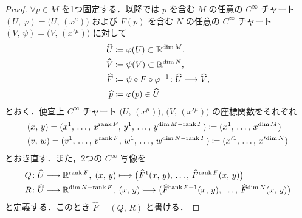 \documentclass[geometry_main]{subfiles}
\begin{document}
\begin{proof}
    $\forall p \in M$ を1つ固定する．以降では $p$ を含む $M$ の任意の $C^\infty$ チャート $(U,\, \varphi) = \bigl( U,\, (x^\mu) \bigr) $ および $F(p)$ を含む $N$ の任意の $C^\infty$ チャート $(V,\, \psi) = \bigl( V,\, (x'{}^\mu) \bigr) $ に対して
    \begin{align}
        \widehat{U} &\coloneqq \varphi(U) \subset \mathbb{R}^{\dim M}, \\
        \widehat{V} &\coloneqq \psi(V) \subset \mathbb{R}^{\dim N}, \\
        \widehat{F} &\coloneqq \psi \circ F \circ \varphi^{-1} \colon \widehat{U} \longrightarrow \widehat{V}, \\
        \widehat{p} &\coloneqq \varphi(p) \in \widehat{U}
    \end{align}
    とおく．便宜上 $C^\infty$ チャート $\bigl(U,\, (x^\mu)\bigr),\, \bigl(V,\, (x'{}^\mu)\bigr)$ の座標関数をそれぞれ
    \begin{align}
        &(x,\, y) = (x^1,\, \dots,\, x^{\rank F},\, y^1,\, \dots,\, y^{\dim M - \rank F})
        \coloneqq (x^1,\, \dots,\, x^{\dim M})  \\
        &(v,\, w) = (v^1,\, \dots,\, v^{\rank F},\, w^1,\, \dots,\, w^{\dim N - \rank F})
        \coloneqq (x'{}^1,\, \dots,\, x'{}^{\dim N}) 
    \end{align}
    とおき直す．また，2つの $C^\infty$ 写像を
    \begin{align}
        Q \colon \widehat{U} &\longrightarrow \mathbb{R}^{\rank F},\; (x,\, y) \longmapsto \bigl( \widehat{F}^1(x,\, y),\, \dots,\, \widehat{F}^{\rank F} (x,\, y) \bigr) \\
        R \colon \widehat{U} &\longrightarrow \mathbb{R}^{\dim N - \rank F},\; (x,\, y) \longmapsto \bigl( \widehat{F}^{\rank F + 1}(x,\, y),\, \dots,\, \widehat{F}^{\dim N} (x,\, y) \bigr)
    \end{align}
    と定義する．このとき $\widehat{F} = (Q,\, R)$ と書ける．
    

\end{proof}
\end{document}
